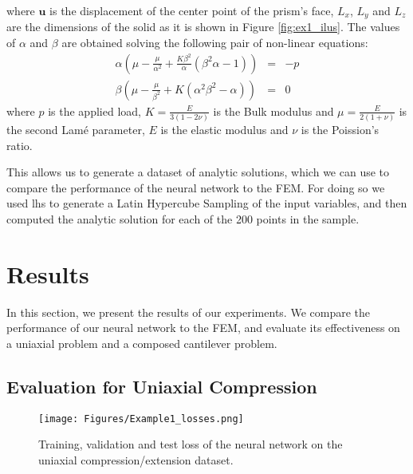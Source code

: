 \documentclass[oneside,a4paper,english,links]{amca}
\begin{document}
where $\boldsymbol{u}$ is the displacement of the center point of the prism's face, $L_x$, $L_y$ and $L_z$ are the dimensions of the solid as it is shown in Figure \ref{fig:ex1_ilus}. The values of $\alpha$ and $\beta$ are obtained solving the following pair of non-linear equations:
%
\begin{eqnarray}
\alpha \left( 
\mu -  \frac{\mu}{\alpha^2} + \frac{K\beta^2}{\alpha} (\beta^2 \alpha -1)  
\right) &=& - p \\
\beta \left( 
	\mu -  \frac{\mu}{\beta^2} + K (\alpha^2\beta^2 - \alpha) 
 \right) &=& 0
\end{eqnarray}
%
where  $p$ is the applied load, $K = \frac{E}{3(1 - 2\nu)}$ is the Bulk modulus and $\mu = \frac{E}{2(1 + \nu)}$ is the second Lamé parameter, $E$ is the elastic modulus and $\nu$ is the Poission's ratio. 



This allows us to generate a dataset of analytic solutions, which we can use to compare the performance of the neural network to the FEM. For doing so we used lhs to generate a Latin Hypercube Sampling of the input variables, and then computed the analytic solution for each of the 200 points in the sample.


\section{Results}
In this section, we present the results of our experiments. We compare the performance of our neural network to the FEM, and evaluate its effectiveness on a uniaxial problem and a composed cantilever problem.

\subsection{Evaluation for Uniaxial Compression}

\begin{figure}[htpb!]
	\centering
	\texttt{[image: Figures/Example1\_losses.png]}
	\caption{Training, validation and test loss of the neural network on the uniaxial compression/extension dataset.}
	\label{fig:train_loss}
	\end{figure}
 
\end{document}

